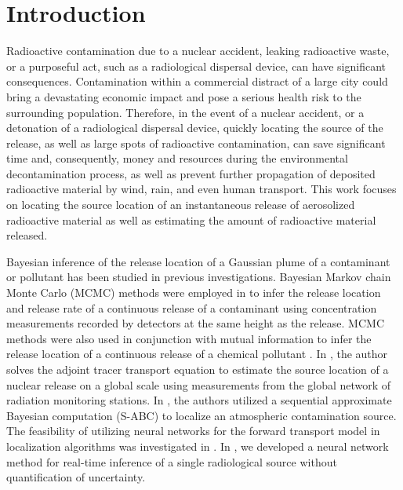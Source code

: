 \documentclass[sn-mathphys-ay]{sn-jnl}
\begin{document}
\maketitle

\section{Introduction}
\label{sec:1}

Radioactive contamination due to a nuclear accident, leaking radioactive waste, or a purposeful act, such as a radiological dispersal device, can have significant consequences. Contamination within a commercial distract of a large city could bring a devastating economic impact and pose a serious health risk to the surrounding population. Therefore, in the event of a nuclear accident, or a detonation of a radiological dispersal device, quickly locating the source of the release, as well as large spots of radioactive contamination, can save significant time and, consequently, money and resources during the environmental decontamination process, as well as prevent further propagation of deposited radioactive material by wind, rain, and even human transport. This work focuses on locating the source location of an instantaneous release of aerosolized radioactive material as well as estimating the amount of radioactive material released.

Bayesian inference of the release location of a Gaussian plume of a contaminant or pollutant has been studied in previous investigations. Bayesian Markov chain Monte Carlo (MCMC) methods were employed in \citep{Borysiewicz} to infer the release location and release rate of a continuous release of a contaminant using concentration measurements recorded by detectors at the same height as the release. MCMC methods were also used in conjunction with mutual information to infer the release location of a continuous release of a chemical pollutant \citep{Kate}. In \citep{Pudykiewicz}, the author solves the adjoint tracer transport equation to estimate the source location of a nuclear release on a global scale using measurements from the global network of radiation monitoring stations. In \citep{Kopka2015,Kopka2016,Kopka2018}, the authors utilized a sequential approximate Bayesian computation (S-ABC) to localize an atmospheric contamination source. The feasibility of utilizing neural networks for the forward transport model in localization algorithms was investigated in \citep{Wawrzynczak2019, Wawrzynczak2020}. In \citep{Edwards}, we developed a neural network method for real-time inference of a single radiological source without quantification of uncertainty.
\end{document}
